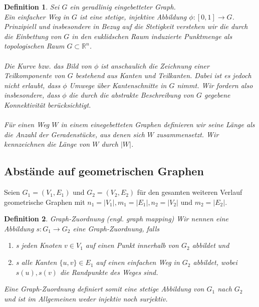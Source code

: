 \documentclass[a4paper, 12pt, twoside]{article}
\theoremstyle{Format1} %
\newtheorem{Def}{Definition}[section]       %
\begin{document}
\begin{Def}
	Sei $G$ ein geradlinig eingebetteter Graph.
	\\
	Ein \textit{einfacher Weg in $G$} ist eine stetige, injektive Abbildung $\phi: [0,1] \to G$.
	Prinzipiell und insbesondere in Bezug auf die Stetigkeit verstehen wir die durch die Einbettung von
	$G$ in den euklidschen Raum induzierte Punktmenge als topologischen Raum $G \subset \mathbb{R}^n$.
	\\
	\\
	Die Kurve bzw. das Bild von $\phi$ ist anschaulich die Zeichnung einer Teilkomponente von $G$ bestehend aus
	Kanten und Teilkanten. Dabei ist es jedoch nicht erlaubt, dass $\phi$ Umwege über Kantenschnitte in $G$ nimmt.
	Wir fordern also insbesondere, dass $\phi$ die durch die abstrakte Beschreibung von $G$ gegebene Konnektivität berücksichtigt.
	\\
	\\
	Für einen Weg $W$ in einem einegebetteten Graphen definieren wir seine \textit{Länge} als die Anzahl der Geradenstücke, aus
	denen sich $W$ zusammensetzt. Wir kennzeichnen die Länge von $W$ durch $|W|$.
\end{Def}

\subsection{Abstände auf geometrischen Graphen}

Seien $ G_1=(V_1, E_1) $ und $ G_2=(V_2, E_2) $ für den gesamten weiteren Verlauf geometrische Graphen mit
$n_1 = |V_1|, m_1 = |E_1|, n_2 = |V_2|$ und $m_2 = |E_2|$.

\begin{Def} \label{Definition Graph-Zuordnung}
	Graph-Zuordnung (engl. graph mapping)
	Wir nennen eine Abbildung $s: G_1 \to G_2 $ eine \textit{Graph-Zuordnung}, falls
    	\begin{enumerate}
		\item[1)] s jeden Knoten $ v \in V_1 $ auf einen Punkt innerhalb von $ G_2 $ abbildet und
		\item[2)] s alle Kanten $ \{u,v\} \in E_1 $ auf einen einfachen Weg in $G_2$ abbildet, wobei $s(u), s(v)$ die Randpunkte des Weges sind.
    	\end{enumerate}

	Eine Graph-Zuordnung definiert somit eine stetige Abbildung von $ G_1 $ nach $ G_2 $ und ist im Allgemeinen weder injektiv noch surjektiv.
\end{Def}
\end{document}
